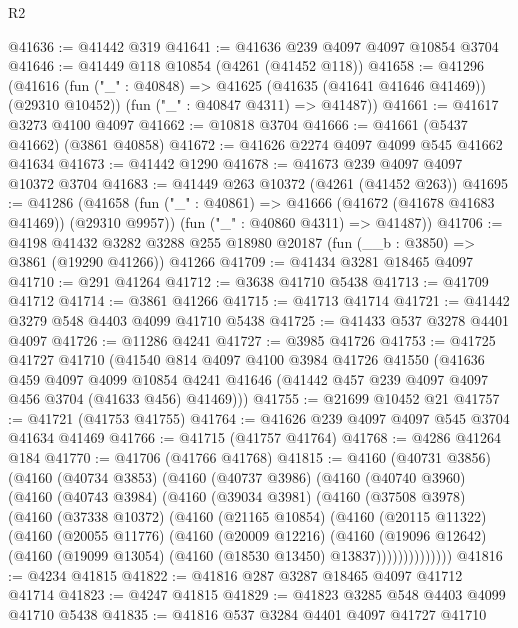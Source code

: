 \begin{lexlean}{R2}
\begin{coremodule}
@41636 := @41442 @319
@41641 := @41636 @239 @4097 @4097 @10854 @3704
@41646 := @41449 @118 @10854 (@4261 (@41452 @118))
@41658 := @41296
    (@41616
      (fun ("_" : @40848) => @41625 (@41635 (@41641 @41646 @41469)) (@29310 @10452))
      (fun ("_" : @40847 @4311) => @41487))
@41661 := @41617 @3273 @4100 @4097
@41662 := @10818 @3704
@41666 := @41661 (@5437 @41662) (@3861 @40858)
@41672 := @41626 @2274 @4097 @4099 @545 @41662 @41634
@41673 := @41442 @1290
@41678 := @41673 @239 @4097 @4097 @10372 @3704
@41683 := @41449 @263 @10372 (@4261 (@41452 @263))
@41695 := @41286
    (@41658
      (fun ("_" : @40861) => @41666 (@41672 (@41678 @41683 @41469)) (@29310 @9957))
      (fun ("_" : @40860 @4311) => @41487))
@41706 := @4198
    @41432
    @3282
    @3288
    @255
    @18980
    @20187
    (fun (__b : @3850) => @3861 (@19290 @41266))
    @41266
@41709 := @41434 @3281 @18465 @4097
@41710 := @291 @41264
@41712 := @3638 @41710 @5438
@41713 := @41709 @41712
@41714 := @3861 @41266
@41715 := @41713 @41714
@41721 := @41442 @3279 @548 @4403 @4099 @41710 @5438
@41725 := @41433 @537 @3278 @4401 @4097
@41726 := @11286 @4241
@41727 := @3985 @41726
@41753 := @41725
    @41727
    @41710
    (@41540
      @814
      @4097
      @4100
      @3984
      @41726
      @41550
      (@41636
        @459
        @4097
        @4099
        @10854
        @4241
        @41646
        (@41442 @457 @239 @4097 @4097 @456 @3704 (@41633 @456) @41469)))
@41755 := @21699 @10452 @21
@41757 := @41721 (@41753 @41755)
@41764 := @41626 @239 @4097 @4097 @545 @3704 @41634 @41469
@41766 := @41715 (@41757 @41764)
@41768 := @4286 @41264 @184
@41770 := @41706 (@41766 @41768)
@41815 := @4160
    (@40731 @3856)
    (@4160
      (@40734 @3853)
      (@4160
        (@40737 @3986)
        (@4160
          (@40740 @3960)
          (@4160
            (@40743 @3984)
            (@4160
              (@39034 @3981)
              (@4160
                (@37508 @3978)
                (@4160
                  (@37338 @10372)
                  (@4160
                    (@21165 @10854)
                    (@4160
                      (@20115 @11322)
                      (@4160
                        (@20055 @11776)
                        (@4160
                          (@20009 @12216)
                          (@4160
                            (@19096 @12642)
                            (@4160 (@19099 @13054) (@4160 (@18530 @13450) @13837))))))))))))))
@41816 := @4234 @41815
@41822 := @41816 @287 @3287 @18465 @4097 @41712 @41714
@41823 := @4247 @41815
@41829 := @41823 @3285 @548 @4403 @4099 @41710 @5438
@41835 := @41816 @537 @3284 @4401 @4097 @41727 @41710

\end{coremodule}
\end{lexlean}

